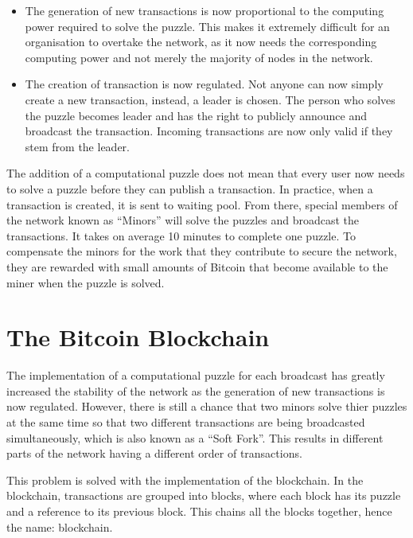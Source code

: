 \documentclass[a4paper, 12pt]{report}
\begin{document}
\begin{itemize}
	\item The generation of new transactions is now proportional to the computing power required to solve the puzzle. This makes it extremely difficult for an organisation to overtake the network, as it now needs the corresponding computing power and not merely the majority of nodes in the network.
	\item The creation of transaction is now regulated. Not anyone can now simply create a new transaction, instead, a leader is chosen. The person who solves the puzzle becomes leader and has the right to publicly announce and broadcast the transaction. Incoming transactions are now only valid if they stem from the leader.
\end{itemize}

\par The addition of a computational puzzle does not mean that every user now needs to solve a puzzle before they can publish a transaction. In practice, when a transaction is created, it is sent to waiting pool. From there, special members of the network known as “Minors” will solve the puzzles and broadcast the transactions. It takes on average 10 minutes to complete one puzzle. To compensate the minors for the work that they contribute to secure the network, they are rewarded with small amounts of Bitcoin that become available to the miner when the puzzle is solved.

\section{The Bitcoin Blockchain}

\par The implementation of a computational puzzle for each broadcast has greatly increased the stability of the network as the generation of new transactions is now regulated. However, there is still a chance that two minors solve thier puzzles at the same time so that two different transactions are being broadcasted simultaneously, which is also known as a “Soft Fork”. This results in different parts of the network having a different order of transactions.

\par This problem is solved with the implementation of the blockchain. In the blockchain, transactions are grouped into blocks, where each block has its puzzle and a reference to its previous block. This chains all the blocks together, hence the name: blockchain.
\end{document}
